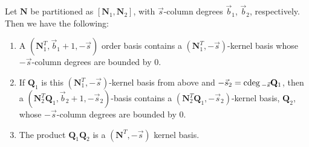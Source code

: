 \begin{lem}
\label{lem:kernelBasisOfSubsetOfRowsContainedInOrderBasis} Let $\mathbf{N}$
be partitioned as $\left[\mathbf{N}_{1},\mathbf{N}_{2}\right]$, with
$\vec{s}$-column degrees $\vec{b}_{1}$, $\vec{b}_{2}$, respectively.
Then we have the following:
\begin{enumerate}
\item A $\left(\mathbf{N}_{1}^{T},\vec{b}_{1}+1,-\vec{s}\right)$ order
basis contains a $\left(\mathbf{N}_{1}^{T},-\vec{s}\right)$-kernel
basis whose $-\vec{s}$-column degrees are bounded by $0$. 
\item If $\mathbf{Q}_{1}$ is this $\left(\mathbf{N}_{1}^{T},-\vec{s}\right)$-kernel
basis from above and $-\vec{s}_{2}={\rm cdeg}\,_{-\vec{s}}\mathbf{Q}_{1}$,
then a $\left(\mathbf{N}_{2}^{T}\mathbf{Q}_{1},\vec{b}_{2}+1,-\vec{s}_{2}\right)$-basis
contains a $\left(\mathbf{N}_{2}^{T}\mathbf{Q}_{1},-\vec{s}_{2}\right)$-kernel
basis, $\mathbf{Q}_{2}$, whose $-\vec{s}$-column degrees are bounded
by $0$. 
\item The product $\mathbf{Q}_{1}\mathbf{Q}_{2}$ is a $\left(\mathbf{N}^{T},-\vec{s}\right)$
kernel basis. 
\end{enumerate}
\end{lem}
